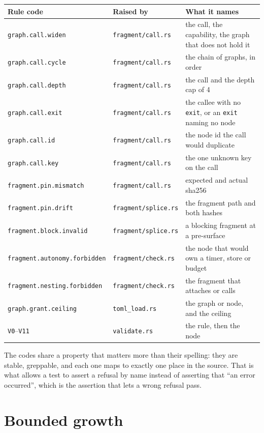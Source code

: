 \begin{longtable}{@{}p{}p{}p{}@{}}
	\toprule
	\textbf{Rule code} & \textbf{Raised by} & \textbf{What it names} \\
	\midrule
	\endhead
	\texttt{graph.call.widen} & \texttt{fragment/call.rs} & the call, the capability, the graph that
	does not hold it \\
	\texttt{graph.call.cycle} & \texttt{fragment/call.rs} & the chain of graphs, in order \\
	\texttt{graph.call.depth} & \texttt{fragment/call.rs} & the call and the depth cap of 4 \\
	\texttt{graph.call.exit} & \texttt{fragment/call.rs} & the callee with no \texttt{exit}, or an
	\texttt{exit} naming no node \\
	\texttt{graph.call.id} & \texttt{fragment/call.rs} & the node id the call would duplicate \\
	\texttt{graph.call.key} & \texttt{fragment/call.rs} & the one unknown key on the call \\
	\texttt{fragment.pin.mismatch} & \texttt{fragment/call.rs} & expected and actual sha256 \\
	\texttt{fragment.pin.drift} & \texttt{fragment/splice.rs} & the fragment path and both hashes \\
	\texttt{fragment.block.invalid} & \texttt{fragment/splice.rs} & a blocking fragment at a
	pre-surface \\
	\texttt{fragment.autonomy.forbidden} & \texttt{fragment/check.rs} & the node that would own a
	timer, store or budget \\
	\texttt{fragment.nesting.forbidden} & \texttt{fragment/check.rs} & the fragment that attaches or
	calls \\
	\texttt{graph.grant.ceiling} & \texttt{toml\_load.rs} & the graph or node, and the ceiling \\
	\texttt{V0}--\texttt{V11} & \texttt{validate.rs} & the rule, then the node \\
	\bottomrule
\end{longtable}

The codes share a property that matters more than their spelling: they are stable, greppable, and
each one maps to exactly one place in the source. That is what allows a test to assert a refusal by
name instead of asserting that \enquote{an error occurred}, which is the assertion that lets a
wrong refusal pass.

\section{Bounded growth}

